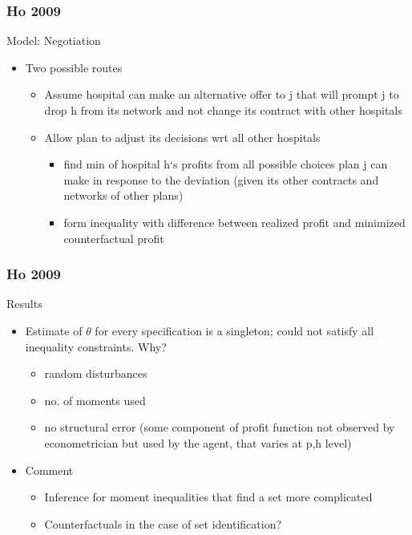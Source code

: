\documentclass[xcolor=pdftex,dvipsnames,table,mathserif]{beamer}
\begin{document}
\begin{frame}
\frametitle{Ho 2009}

Model: Negotiation
\begin{itemize}
\item Two possible routes
\begin{itemize}
\item Assume hospital can make an alternative offer to j that will prompt j to drop h from its network and not change its contract with other hospitals
\item Allow plan to adjust its decisions wrt all other hospitals
\begin{itemize}
\item find min of hospital h`s profits from all possible choices plan j can make in response to the deviation (given its other contracts and networks of other plans)
\item form inequality with difference between realized profit and minimized counterfactual profit
\end{itemize}

\end{itemize}
\end{itemize}

\end{frame}

\begin{frame}
\frametitle{Ho 2009}

Results
\begin{itemize}
\item Estimate of $\theta$ for every specification is a singleton; could not satisfy all inequality constraints.  Why?
\begin{itemize}
\item random disturbances
\item no. of moments used
\item no structural error (some component of profit function not observed by econometrician but used by the agent, that varies at p,h level)
\end{itemize}
\item Comment
\begin{itemize}
\item Inference for moment inequalities that find a set more complicated
\item Counterfactuals in the case of set identification?
\end{itemize}
\end{itemize}
\end{frame}
\end{document}
